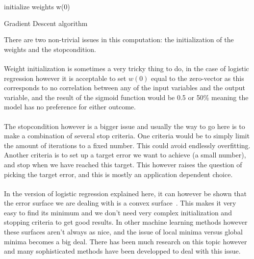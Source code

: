 \vspace{1em}
\begin{algorithm}[H]
	initialize weights w(0) \\
\SetAlCapSkip{1em}
\caption{Gradient Descent algorithm}
\end{algorithm}
\vspace{1em}
There are two non-trivial issues in this computation: the initialization of the weights and the stopcondition. \\ \\
Weight initialization is sometimes a very tricky thing to do, in the case of logistic regression however it is acceptable to set $w(0)$ equal to the zero-vector as this corresponds to no correlation between any of the input variables and the output variable, and the result of the sigmoid function would be 0.5 or 50\% meaning the model has no preference for either outcome.\\ \\
The stopcondition however is a bigger issue and usually the way to go here is to make a combination of several stop criteria. One criteria would be to simply limit the amount of iterations to a fixed number. This could avoid endlessly overfitting. Another criteria is to set up a target error we want to achieve (a small number), and stop when we have reached this target. This however raises the question of picking the target error, and this is mostly an application dependent choice. \\ \\
In the version of logistic regression explained here, it can however be shown that the error surface we are dealing with is a convex surface~\cite{convexerrorlogistic}. This makes it very easy to find its minimum and we don't need very complex initialization and stopping criteria to get good results. In other machine learning methods however these surfaces aren't always as nice, and the issue of local minima versus global minima becomes a big deal. There has been much research on this topic however and many sophisticated methods have been developped to deal with this issue.

